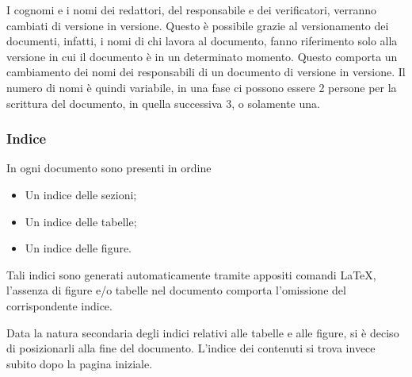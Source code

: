 \documentclass[a4paper]{article}
\begin{document}
		I cognomi e i nomi dei redattori, del responsabile e dei verificatori, verranno cambiati di versione in versione. Questo è possibile
		grazie al versionamento dei documenti, infatti, i nomi di chi lavora al documento, fanno riferimento solo alla versione in cui il documento
		è in un determinato momento. Questo comporta un cambiamento dei nomi dei responsabili di un documento di versione in versione. Il numero di nomi
		è quindi variabile, in una fase ci possono essere 2 persone per la scrittura del documento, in quella successiva 3, o solamente una.
		
		\subsubsection{Indice}
			In ogni documento sono presenti in ordine
			\begin{itemize}
				\item Un indice delle sezioni;
				\item Un indice delle tabelle;
				\item Un indice delle figure.
			\end{itemize}
			Tali indici sono generati automaticamente tramite appositi comandi \LaTeX, l'assenza di figure
			e/o tabelle nel documento comporta l'omissione del corrispondente indice.

		Data la natura secondaria degli indici relativi alle tabelle e alle figure, si è deciso di posizionarli alla fine del documento.
		L'indice dei contenuti si trova invece subito dopo la pagina iniziale.
\end{document}
